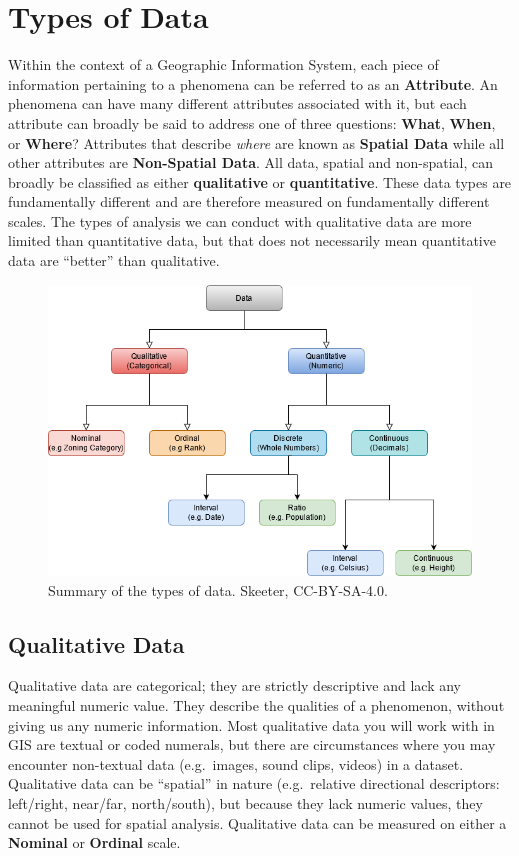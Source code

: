 \documentclass[
]{book}
\begin{document}
\hypertarget{types-of-data-1}{%
\section{Types of Data}\label{types-of-data-1}}

Within the context of a Geographic Information System, each piece of information pertaining to a phenomena can be referred to as an \textbf{Attribute}. An phenomena can have many different attributes associated with it, but each attribute can broadly be said to address one of three questions: \textbf{What}, \textbf{When}, or \textbf{Where}? Attributes that describe \emph{where} are known as \textbf{Spatial Data} while all other attributes are \textbf{Non-Spatial Data}. All data, spatial and non-spatial, can broadly be classified as either \textbf{qualitative} or \textbf{quantitative}. These data types are fundamentally different and are therefore measured on fundamentally different scales. The types of analysis we can conduct with qualitative data are more limited than quantitative data, but that does not necessarily mean quantitative data are ``better'' than qualitative.

\begin{figure}
\includegraphics[width=0.75\linewidth]{images/03-data-types} \caption{Summary of the types of data. Skeeter, CC-BY-SA-4.0.}\label{fig:3-data-types}
\end{figure}

\hypertarget{qualitative-data}{%
\subsection{Qualitative Data}\label{qualitative-data}}

Qualitative data are categorical; they are strictly descriptive and lack any meaningful numeric value. They describe the qualities of a phenomenon, without giving us any numeric information. Most qualitative data you will work with in GIS are textual or coded numerals, but there are circumstances where you may encounter non-textual data (e.g.~images, sound clips, videos) in a dataset. Qualitative data can be ``spatial'' in nature (e.g.~relative directional descriptors: left/right, near/far, north/south), but because they lack numeric values, they cannot be used for spatial analysis. Qualitative data can be measured on either a \textbf{Nominal} or \textbf{Ordinal} scale.
\end{document}

